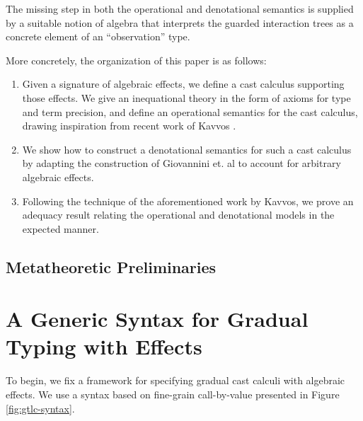 \documentclass[acmsmall, screen]{acmart}
\theoremstyle{remark}
\begin{document}
The missing step in both the operational and denotational semantics is supplied
by a suitable notion of algebra that interprets the guarded interaction trees as
a concrete element of an ``observation'' type.

More concretely, the organization of this paper is as follows:
\begin{enumerate}
    \item Given a signature of algebraic effects, we define a cast calculus
    supporting those effects. We give an inequational theory in the form of
    axioms for type and term precision, and define an operational semantics for
    the cast calculus, drawing inspiration from recent work of Kavvos
    \cite{TODO}.
    \item We show how to construct a denotational semantics for such a cast
    calculus by adapting the construction of Giovannini et. al \cite{gtt-sgdt}
    to account for arbitrary algebraic effects.
    \item Following the technique of the aforementioned work by Kavvos, we prove
    an adequacy result relating the operational and denotational models in the
    expected manner.
\end{enumerate}


\subsection{Metatheoretic Preliminaries}



\section{A Generic Syntax for Gradual Typing with Effects}\label{sec:syntax}

To begin, we fix a framework for specifying gradual cast calculi with algebraic
effects. We use a syntax based on fine-grain call-by-value presented in Figure
\ref{fig:gtlc-syntax}.


\end{document}
